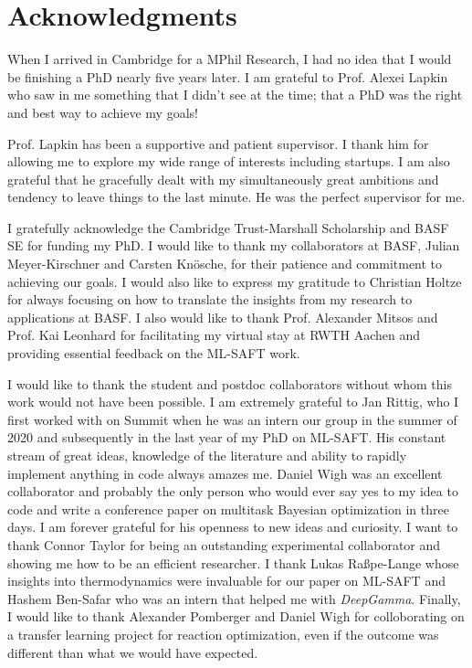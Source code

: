 
\chapter*{Acknowledgments}
When I arrived in Cambridge for a MPhil Research, I had no idea that I would be finishing  a PhD nearly five years later. I am grateful to Prof. Alexei Lapkin who saw in me something that I didn't see at the time; that a PhD was the right and best way to achieve my goals!

Prof. Lapkin has been a supportive and patient supervisor. I thank him for allowing me to explore my wide range of interests including startups. I am also grateful that he gracefully dealt with my simultaneously great ambitions and tendency to leave things to the last minute. He was the perfect supervisor for me.

I gratefully acknowledge the Cambridge Trust-Marshall Scholarship and BASF SE for funding my PhD. I would like to thank my collaborators at BASF, Julian Meyer-Kirschner and Carsten Kn\"osche, for their patience and commitment to achieving our goals. I would also like to express my gratitude to Christian Holtze for always focusing on how to translate the insights from my research to applications at BASF. I also would like to thank Prof. Alexander Mitsos and Prof. Kai Leonhard for facilitating my virtual stay at RWTH Aachen and providing essential feedback on the ML-SAFT work. 

I would like to thank the student and postdoc collaborators without whom this work would not have been possible. I am extremely grateful to Jan Rittig, who I first worked with on Summit when he was an intern our group in the summer of 2020 and subsequently in the last year of my PhD on ML-SAFT. His constant stream of great ideas, knowledge of the literature and ability to rapidly implement anything in code always amazes me. Daniel Wigh was an excellent collaborator and probably the only person who would ever say yes to my idea to code and write a conference paper on multitask Bayesian optimization in three days. I am forever grateful for his openness to new ideas and curiosity. I want to thank Connor Taylor for being an outstanding experimental collaborator and showing me how to be an efficient researcher. I thank Lukas Ra{\ss}pe-Lange whose insights into thermodynamics were invaluable for our paper on ML-SAFT and Hashem Ben-Safar who was an intern that helped me with \textit{DeepGamma}. Finally, I would like to thank Alexander Pomberger and Daniel Wigh for colloborating on a transfer learning project for reaction optimization, even if the outcome was different
than what we would have expected.

